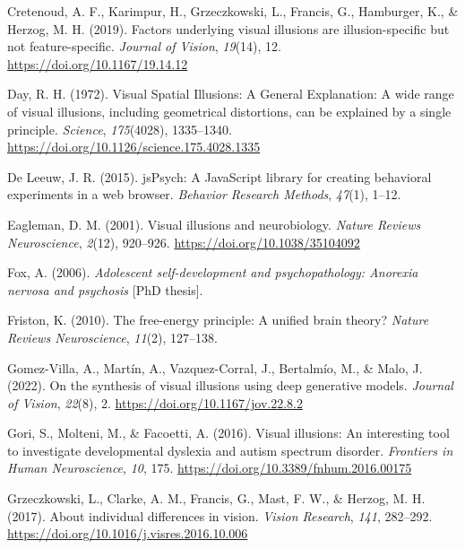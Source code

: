 \documentclass[
  man,floatsintext]{apa6}
\newlength{\cslhangindent}
\newlength{\cslentryspacingunit} %
\newenvironment{CSLReferences}[2] %
 {%
  \setlength{\parindent}{0pt}
  \ifodd #1
  \let\oldpar\par
  \def\par{\hangindent=\cslhangindent\oldpar}
  \fi
  \setlength{\parskip}{#2\cslentryspacingunit}
 }%
 {}
\begin{document}
\begin{CSLReferences}{1}{0}
\leavevmode{}%
Cretenoud, A. F., Karimpur, H., Grzeczkowski, L., Francis, G., Hamburger, K., \& Herzog, M. H. (2019). Factors underlying visual illusions are illusion-specific but not feature-specific. \emph{Journal of Vision}, \emph{19}(14), 12. \url{https://doi.org/10.1167/19.14.12}

\leavevmode{}%
Day, R. H. (1972). Visual Spatial Illusions: A General Explanation: A wide range of visual illusions, including geometrical distortions, can be explained by a single principle. \emph{Science}, \emph{175}(4028), 1335--1340. \url{https://doi.org/10.1126/science.175.4028.1335}

\leavevmode{}%
De Leeuw, J. R. (2015). jsPsych: A JavaScript library for creating behavioral experiments in a web browser. \emph{Behavior Research Methods}, \emph{47}(1), 1--12.

\leavevmode{}%
Eagleman, D. M. (2001). Visual illusions and neurobiology. \emph{Nature Reviews Neuroscience}, \emph{2}(12), 920--926. \url{https://doi.org/10.1038/35104092}

\leavevmode{}%
Fox, A. (2006). \emph{Adolescent self-development and psychopathology: Anorexia nervosa and psychosis} {[}PhD thesis{]}.

\leavevmode{}%
Friston, K. (2010). The free-energy principle: A unified brain theory? \emph{Nature Reviews Neuroscience}, \emph{11}(2), 127--138.

\leavevmode{}%
Gomez-Villa, A., Martín, A., Vazquez-Corral, J., Bertalmío, M., \& Malo, J. (2022). On the synthesis of visual illusions using deep generative models. \emph{Journal of Vision}, \emph{22}(8), 2. \url{https://doi.org/10.1167/jov.22.8.2}

\leavevmode{}%
Gori, S., Molteni, M., \& Facoetti, A. (2016). Visual illusions: An interesting tool to investigate developmental dyslexia and autism spectrum disorder. \emph{Frontiers in Human Neuroscience}, \emph{10}, 175. \url{https://doi.org/10.3389/fnhum.2016.00175}

\leavevmode{}%
Grzeczkowski, L., Clarke, A. M., Francis, G., Mast, F. W., \& Herzog, M. H. (2017). About individual differences in vision. \emph{Vision Research}, \emph{141}, 282--292. \url{https://doi.org/10.1016/j.visres.2016.10.006}


\end{CSLReferences}
\end{document}
